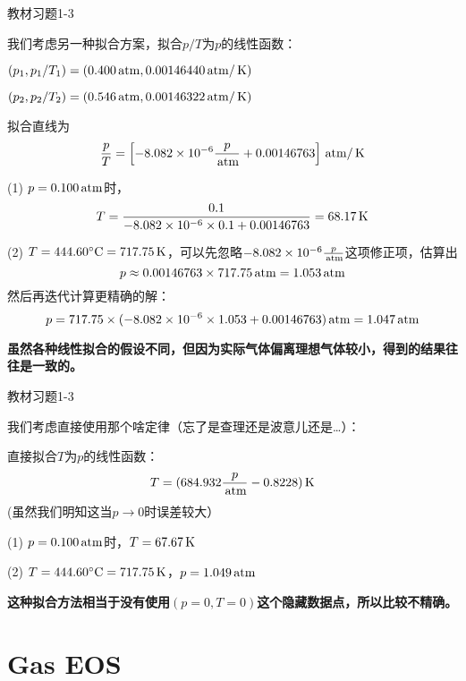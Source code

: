 \documentclass[CJK]{beamer}
\begin{document}
\begin{frame}
\bch
{\blue 教材习题1-3}

{\scriptsize
我们考虑另一种拟合方案，拟合$p/T$为$p$的线性函数：

$(p_1, p_1/T_1) = (0.400\,\mathrm{atm}, 0.00146440 \,\mathrm{atm}/\,\mathrm{K})$

$(p_2, p_2/T_2) = (0.546\,\mathrm{atm}, 0.00146322  \,\mathrm{atm}/\,\mathrm{K})$

拟合直线为
$$\frac{p}{T} = \left[-8.082\times 10^{-6}\frac{p}{\,\mathrm{atm}} + 0.00146763\right]\,\mathrm{atm}/\,\mathrm{K} $$

\bitem
\item[(1)]{$p=0.100\,\mathrm{atm}$时，
$$T  = \frac{0.1}{-8.082\times 10^{-6}\times 0.1 + 0.00146763} = 68.17\,\mathrm{K}$$
}
\item[(2)]{$T=444.60^\circ \mathrm{C} = 717.75\,\mathrm{K}$，可以先忽略$-8.082\times 10^{-6}\frac{p}{\,\mathrm{atm}} $这项修正项，估算出
$$p \approx 0.00146763\times 717.75 \,\mathrm{atm} = 1.053\,\mathrm{atm}$$
然后再迭代计算更精确的解：
$$ p = 717.75\times(-8.082\times 10^{-6}\times 1.053 + 0.00146763) \,\mathrm{atm} = 1.047 \,\mathrm{atm} $$
}
\eitem

{\bf 虽然各种线性拟合的假设不同，但因为实际气体偏离理想气体较小，得到的结果往往是一致的。}

}

\ech
\end{frame}


\begin{frame}
\bch
{\blue 教材习题1-3}

\skipline

{\scriptsize
我们考虑直接使用那个啥定律（忘了是查理还是波意儿还是…）：

直接拟合$T$为$p$的线性函数：
$$ T = (684.932\frac{p}{\,\mathrm{atm}} -0.8228)\,\mathrm{K}$$
(虽然我们明知这当$p\rightarrow 0$时误差较大）

\bitem
\item[(1)]{$p=0.100\,\mathrm{atm}$时，$T=67.67\,\mathrm{K}$}
\item[(2)]{$T=444.60^\circ \mathrm{C} = 717.75\,\mathrm{K}$，$p  = 1.049\,\mathrm{atm}$}
\eitem

{\bf 这种拟合方法相当于没有使用$(p=0, T=0)$这个隐藏数据点，所以比较不精确。}

}

\ech
\end{frame}


\section{Gas EOS}
\end{document}
